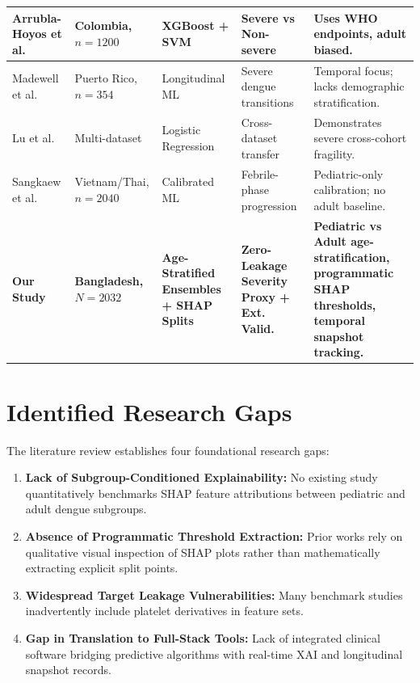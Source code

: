 \documentclass[12pt, a4paper]{report}
\begin{document}
\begin{xltabular}{\textwidth}{|X|X|X|X|X|}
\hline
Arrubla-Hoyos et al. \cite{arrubla2023} & Colombia, $n=1200$ & XGBoost + SVM & Severe vs Non-severe & Uses WHO endpoints, adult biased. \\
\hline
Madewell et al. \cite{madewell2024} & Puerto Rico, $n=354$ & Longitudinal ML & Severe dengue transitions & Temporal focus; lacks demographic stratification. \\
\hline
Lu et al. \cite{lu2025} & Multi-dataset & Logistic Regression & Cross-dataset transfer & Demonstrates severe cross-cohort fragility. \\
\hline
Sangkaew et al. \cite{sangkaew2026} & Vietnam/Thai, $n=2040$ & Calibrated ML & Febrile-phase progression & Pediatric-only calibration; no adult baseline. \\
\hline
\textbf{Our Study} & \textbf{Bangladesh, $N=2032$} & \textbf{Age-Stratified Ensembles + SHAP Splits} & \textbf{Zero-Leakage Severity Proxy + Ext. Valid.} & \textbf{Pediatric vs Adult age-stratification, programmatic SHAP thresholds, temporal snapshot tracking.} \\
\hline
\end{xltabular}
\endgroup

\section{Identified Research Gaps}
The literature review establishes four foundational research gaps:
\begin{enumerate}
    \item \textbf{Lack of Subgroup-Conditioned Explainability:} No existing study quantitatively benchmarks SHAP feature attributions between pediatric and adult dengue subgroups.
    \item \textbf{Absence of Programmatic Threshold Extraction:} Prior works rely on qualitative visual inspection of SHAP plots rather than mathematically extracting explicit split points.
    \item \textbf{Widespread Target Leakage Vulnerabilities:} Many benchmark studies inadvertently include platelet derivatives in feature sets.
    \item \textbf{Gap in Translation to Full-Stack Tools:} Lack of integrated clinical software bridging predictive algorithms with real-time XAI and longitudinal snapshot records.
\end{enumerate}

\end{document}
